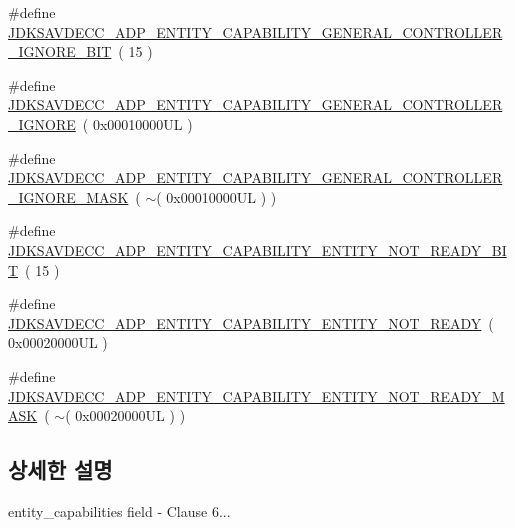 \begin{DoxyCompactItemize}
\item 
\#define \hyperlink{group__adp__entity__capability_ga7aa70aefd6508e8375430c57f0ae6764}{J\+D\+K\+S\+A\+V\+D\+E\+C\+C\+\_\+\+A\+D\+P\+\_\+\+E\+N\+T\+I\+T\+Y\+\_\+\+C\+A\+P\+A\+B\+I\+L\+I\+T\+Y\+\_\+\+G\+E\+N\+E\+R\+A\+L\+\_\+\+C\+O\+N\+T\+R\+O\+L\+L\+E\+R\+\_\+\+I\+G\+N\+O\+R\+E\+\_\+\+B\+IT}~( 15 )
\item 
\#define \hyperlink{group__adp__entity__capability_gacad8c6cd2afcbc80ef2761720ec9402e}{J\+D\+K\+S\+A\+V\+D\+E\+C\+C\+\_\+\+A\+D\+P\+\_\+\+E\+N\+T\+I\+T\+Y\+\_\+\+C\+A\+P\+A\+B\+I\+L\+I\+T\+Y\+\_\+\+G\+E\+N\+E\+R\+A\+L\+\_\+\+C\+O\+N\+T\+R\+O\+L\+L\+E\+R\+\_\+\+I\+G\+N\+O\+RE}~( 0x00010000\+U\+L )
\item 
\#define \hyperlink{group__adp__entity__capability_ga137e03f8ba687562b103de4403080207}{J\+D\+K\+S\+A\+V\+D\+E\+C\+C\+\_\+\+A\+D\+P\+\_\+\+E\+N\+T\+I\+T\+Y\+\_\+\+C\+A\+P\+A\+B\+I\+L\+I\+T\+Y\+\_\+\+G\+E\+N\+E\+R\+A\+L\+\_\+\+C\+O\+N\+T\+R\+O\+L\+L\+E\+R\+\_\+\+I\+G\+N\+O\+R\+E\+\_\+\+M\+A\+SK}~( $\sim$( 0x00010000\+U\+L ) )
\item 
\#define \hyperlink{group__adp__entity__capability_ga8efa9080c2bc91a3dbe5ac384f3e3f8f}{J\+D\+K\+S\+A\+V\+D\+E\+C\+C\+\_\+\+A\+D\+P\+\_\+\+E\+N\+T\+I\+T\+Y\+\_\+\+C\+A\+P\+A\+B\+I\+L\+I\+T\+Y\+\_\+\+E\+N\+T\+I\+T\+Y\+\_\+\+N\+O\+T\+\_\+\+R\+E\+A\+D\+Y\+\_\+\+B\+IT}~( 15 )
\item 
\#define \hyperlink{group__adp__entity__capability_gab7bee74d62b6e68f35f85b6889a61b84}{J\+D\+K\+S\+A\+V\+D\+E\+C\+C\+\_\+\+A\+D\+P\+\_\+\+E\+N\+T\+I\+T\+Y\+\_\+\+C\+A\+P\+A\+B\+I\+L\+I\+T\+Y\+\_\+\+E\+N\+T\+I\+T\+Y\+\_\+\+N\+O\+T\+\_\+\+R\+E\+A\+DY}~( 0x00020000\+U\+L )
\item 
\#define \hyperlink{group__adp__entity__capability_ga09829319d210779a8c26f1962c208ee1}{J\+D\+K\+S\+A\+V\+D\+E\+C\+C\+\_\+\+A\+D\+P\+\_\+\+E\+N\+T\+I\+T\+Y\+\_\+\+C\+A\+P\+A\+B\+I\+L\+I\+T\+Y\+\_\+\+E\+N\+T\+I\+T\+Y\+\_\+\+N\+O\+T\+\_\+\+R\+E\+A\+D\+Y\+\_\+\+M\+A\+SK}~( $\sim$( 0x00020000\+U\+L ) )
\end{DoxyCompactItemize}


\subsection{상세한 설명}
entity\+\_\+capabilities field -\/ Clause 6... 

